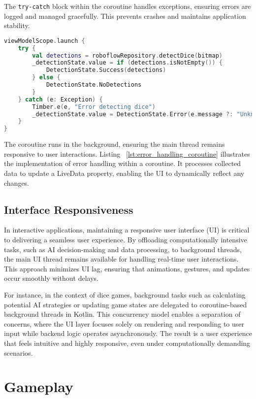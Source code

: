 The \texttt{try-catch} block within the coroutine handles exceptions, ensuring errors are logged and managed gracefully. This prevents crashes and maintains application stability.
\begin{lstlisting}[language=Kotlin, caption={Error Handling in Coroutines}, label=lst:error_handling_coroutine]
viewModelScope.launch {
    try {
        val detections = roboflowRepository.detectDice(bitmap)
        _detectionState.value = if (detections.isNotEmpty()) {
            DetectionState.Success(detections)
        } else {
            DetectionState.NoDetections
        }
    } catch (e: Exception) {
        Timber.e(e, "Error detecting dice")
        _detectionState.value = DetectionState.Error(e.message ?: "Unknown error")
    }
}
\end{lstlisting}

The coroutine runs in the background, ensuring the main thread remains responsive to user interactions. Listing ~\ref{lst:error_handling_coroutine} illustrates the implementation of error handling within a coroutine. It processes collected data to update a LiveData property, enabling the UI to dynamically reflect any changes.

\subsection{Interface Responsiveness}

In interactive applications, maintaining a responsive user interface (UI) is critical to delivering a seamless user experience. By offloading computationally intensive tasks, such as AI decision-making and data processing, to background threads, the main UI thread remains available for handling real-time user interactions. This approach minimizes UI lag, ensuring that animations, gestures, and updates occur smoothly without delays.

For instance, in the context of dice games, background tasks such as calculating potential AI strategies or updating game states are delegated to coroutine-based background threads in Kotlin. This concurrency model enables a separation of concerns, where the UI layer focuses solely on rendering and responding to user input while backend logic operates asynchronously. The result is a user experience that feels intuitive and highly responsive, even under computationally demanding scenarios.

\section{Gameplay}

